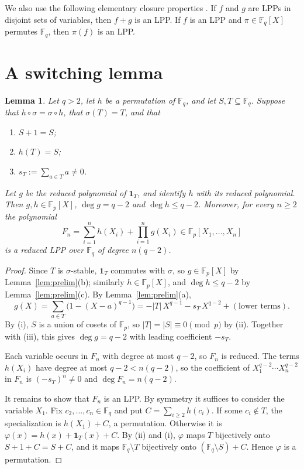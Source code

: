 \documentclass[11pt]{amsart}
\newtheorem{lemma}[theorem]{Lemma}
\theoremstyle{definition}
\theoremstyle{remark}
\newcommand{\F}{\mathbb{F}}
\newcommand{\one}{\mathbf{1}}
\begin{document}
We also use the following elementary closure properties \cite[Theorem~1]{GU25a}. If $f$ and $g$ are LPPs in disjoint sets of variables, then $f+g$ is an LPP. If $f$ is an LPP and $\pi\in\F_q[X]$ permutes $\F_q$, then $\pi(f)$ is an LPP.

\section{A switching lemma}\label{sec:switch}

\begin{lemma}\label{lem:switch}
Let $q>2$, let $h$ be a permutation of $\F_q$, and let $S,T\subseteq\F_q$. Suppose that $h\circ\sigma=\sigma\circ h$, that $\sigma(T)=T$, and that
\begin{enumerate}
\item[(i)] $S+1=S$;
\item[(ii)] $h(T)=S$;
\item[(iii)] $s_T:=\sum_{a\in T}a\ne0$.
\end{enumerate}
Let $g$ be the reduced polynomial of $\one_T$, and identify $h$ with its reduced polynomial. Then $g,h\in\F_p[X]$, $\deg g=q-2$ and $\deg h\le q-2$. Moreover, for every $n\ge2$ the polynomial
\[
F_n=\sum_{i=1}^n h(X_i)+\prod_{i=1}^n g(X_i)\in\F_p[X_1,\dots,X_n]
\]
is a reduced LPP over $\F_q$ of degree $n(q-2)$.
\end{lemma}

\begin{proof}
Since $T$ is $\sigma$-stable, $\one_T$ commutes with $\sigma$, so $g\in\F_p[X]$ by Lemma~\ref{lem:prelim}(b); similarly $h\in\F_p[X]$, and $\deg h\le q-2$ by Lemma~\ref{lem:prelim}(c). By Lemma~\ref{lem:prelim}(a),
\[
g(X)=\sum_{a\in T}\bigl(1-(X-a)^{q-1}\bigr)=-|T|\,X^{q-1}-s_T\,X^{q-2}+(\text{lower terms}).
\]
By (i), $S$ is a union of cosets of $\F_p$, so $|T|=|S|\equiv0\pmod p$ by (ii). Together with (iii), this gives $\deg g=q-2$ with leading coefficient $-s_T$.

Each variable occurs in $F_n$ with degree at most $q-2$, so $F_n$ is reduced. The terms $h(X_i)$ have degree at most $q-2<n(q-2)$, so the coefficient of $X_1^{q-2}\cdots X_n^{q-2}$ in $F_n$ is $(-s_T)^n\ne0$ and $\deg F_n=n(q-2)$.

It remains to show that $F_n$ is an LPP. By symmetry it suffices to consider the variable $X_1$. Fix $c_2,\dots,c_n\in\F_q$ and put $C=\sum_{i\ge2}h(c_i)$. If some $c_i\notin T$, the specialization is $h(X_1)+C$, a permutation. Otherwise it is $\varphi(x)=h(x)+\one_T(x)+C$. By (ii) and (i), $\varphi$ maps $T$ bijectively onto $S+1+C=S+C$, and it maps $\F_q\setminus T$ bijectively onto $(\F_q\setminus S)+C$. Hence $\varphi$ is a permutation.
\end{proof}
\end{document}
